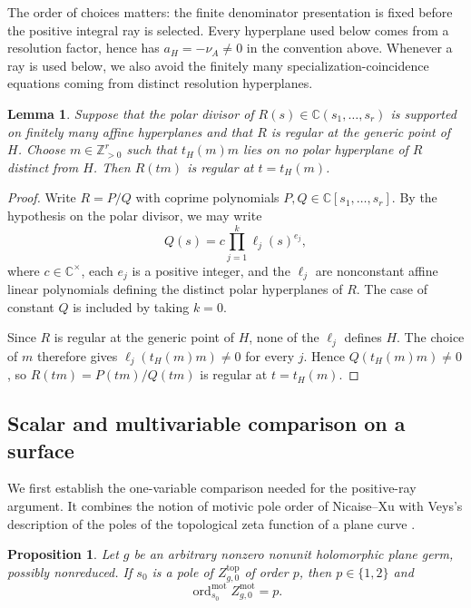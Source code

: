 \documentclass[12pt]{amsart}
\numberwithin{equation}{section}
\theoremstyle{plain}
\newtheorem{proposition}[theorem]{Proposition}
\newtheorem{lemma}[theorem]{Lemma}
\theoremstyle{definition}
\theoremstyle{remark}
\theoremstyle{definition}
\DeclareMathOperator{\ord}{ord}
\newcommand{\C}{\mathbb C}
\newcommand{\Z}{\mathbb Z}
\begin{document}
The order of choices matters: the finite denominator presentation is fixed before the positive integral ray is selected. Every hyperplane used below comes from a resolution factor, hence has $a_H=-\nu_A\ne0$ in the convention above. Whenever a ray is used below, we also avoid the finitely many specialization-coincidence equations coming from distinct resolution hyperplanes.

\begin{lemma}\label{lem:motivic-rational-restriction}
Suppose that the polar divisor of $R(s)\in\C(s_1,\ldots,s_r)$ is supported on finitely many affine hyperplanes and that $R$ is regular at the generic point of $H$. Choose $m\in\Z_{>0}^r$ such that $t_H(m)m$ lies on no polar hyperplane of $R$ distinct from $H$. Then $R(tm)$ is regular at $t=t_H(m)$.
\end{lemma}

\begin{proof}
Write $R=P/Q$ with coprime polynomials $P,Q\in\C[s_1,\ldots,s_r]$. By the hypothesis on the polar divisor, we may write
\[
Q(s)=c\prod_{j=1}^k\ell_j(s)^{e_j},
\]
where $c\in\C^\times$, each $e_j$ is a positive integer, and the $\ell_j$ are nonconstant affine linear polynomials defining the distinct polar hyperplanes of $R$. The case of constant $Q$ is included by taking $k=0$.

Since $R$ is regular at the generic point of $H$, none of the $\ell_j$ defines $H$. The choice of $m$ therefore gives $\ell_j(t_H(m)m)\ne0$ for every $j$. Hence $Q(t_H(m)m)\ne0$, so $R(tm)=P(tm)/Q(tm)$ is regular at $t=t_H(m)$.
\end{proof}


\subsection{Scalar and multivariable comparison on a surface}

We first establish the one-variable comparison needed for the positive-ray argument. It combines the notion of motivic pole order of Nicaise--Xu \cite[Remark~3.7]{NicaiseXu2016} with Veys's description of the poles of the topological zeta function of a plane curve \cite{Veys1995}.

\begin{proposition}\label{prop:scalar-motivic-topological-order}
Let $g$ be an arbitrary nonzero nonunit holomorphic plane germ, possibly nonreduced. If $s_0$ is a pole of $Z^{\mathrm{top}}_{g,0}$ of order $p$, then $p\in\{1,2\}$ and
\begin{equation*}
\ord_{s_0}^{\mathrm{mot}}Z^{\mathrm{mot}}_{g,0}=p.
\end{equation*}
\end{proposition}
\end{document}
